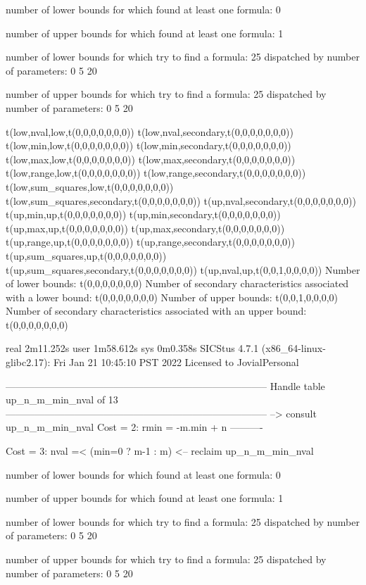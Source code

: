 number of lower bounds for which found at least one formula: 0

number of upper bounds for which found at least one formula: 1

number of lower bounds for which try to find a formula: 25
dispatched by number of parameters: 0  5  20

number of upper bounds for which try to find a formula: 25
dispatched by number of parameters: 0  5  20

t(low,nval,low,t(0,0,0,0,0,0,0))
t(low,nval,secondary,t(0,0,0,0,0,0,0))
t(low,min,low,t(0,0,0,0,0,0,0))
t(low,min,secondary,t(0,0,0,0,0,0,0))
t(low,max,low,t(0,0,0,0,0,0,0))
t(low,max,secondary,t(0,0,0,0,0,0,0))
t(low,range,low,t(0,0,0,0,0,0,0))
t(low,range,secondary,t(0,0,0,0,0,0,0))
t(low,sum_squares,low,t(0,0,0,0,0,0,0))
t(low,sum_squares,secondary,t(0,0,0,0,0,0,0))
t(up,nval,secondary,t(0,0,0,0,0,0,0))
t(up,min,up,t(0,0,0,0,0,0,0))
t(up,min,secondary,t(0,0,0,0,0,0,0))
t(up,max,up,t(0,0,0,0,0,0,0))
t(up,max,secondary,t(0,0,0,0,0,0,0))
t(up,range,up,t(0,0,0,0,0,0,0))
t(up,range,secondary,t(0,0,0,0,0,0,0))
t(up,sum_squares,up,t(0,0,0,0,0,0,0))
t(up,sum_squares,secondary,t(0,0,0,0,0,0,0))
t(up,nval,up,t(0,0,1,0,0,0,0))
Number of lower bounds:                                             t(0,0,0,0,0,0,0)
Number of secondary characteristics associated with a lower bound:  t(0,0,0,0,0,0,0)
Number of upper bounds:                                             t(0,0,1,0,0,0,0)
Number of secondary characteristics associated with an upper bound: t(0,0,0,0,0,0,0)

real	2m11.252s
user	1m58.612s
sys	0m0.358s
SICStus 4.7.1 (x86_64-linux-glibc2.17): Fri Jan 21 10:45:10 PST 2022
Licensed to JovialPersonal


--------------------------------------------------------------------------------
Handle table up_n_m_min_nval of 13
--------------------------------------------------------------------------------
--> consult up_n_m_min_nval
Cost =  2:  rmin = -m.min + n
----------

Cost =  3:  nval =< (min=0 ? m-1 : m)
<-- reclaim up_n_m_min_nval

number of lower bounds for which found at least one formula: 0

number of upper bounds for which found at least one formula: 1

number of lower bounds for which try to find a formula: 25
dispatched by number of parameters: 0  5  20

number of upper bounds for which try to find a formula: 25
dispatched by number of parameters: 0  5  20

